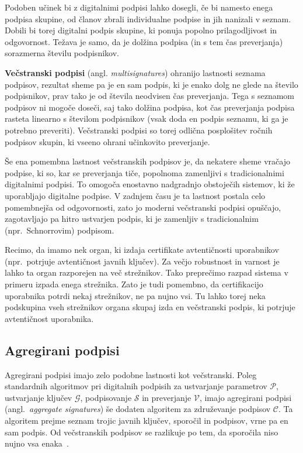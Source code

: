 Podoben učinek bi z digitalnimi podpisi lahko dosegli, če bi namesto enega podpisa skupine, od članov 
zbrali individualne podpise in jih nanizali v seznam. Dobili bi torej digitalni podpis skupine, ki 
ponuja popolno prilagodljivost in odgovornost. Težava je samo, da je dolžina podpisa (in s tem čas 
preverjanja) sorazmerna številu podpisnikov.

\textbf{Večstranski podpisi} (angl. \textit{multisignatures})
ohranijo lastnosti seznama podpisov, rezultat sheme pa je en sam podpis, ki je enako dolg ne glede 
na število podpisnikov, prav tako je od števila neodvisen čas preverjanja. Tega s seznamom podpisov 
ni mogoče doseči, saj tako dolžina podpisa, kot čas preverjanja podpisa rasteta linearno s številom 
podpisnikov (vsak doda en podpis seznamu, ki ga je potrebno preveriti). Večstranski podpisi so torej 
odlična posplošitev ročnih podpisov skupin, ki vseeno ohrani učinkovito preverjanje.

Še ena pomembna lastnost večstranskih podpisov je, da nekatere sheme vračajo podpise, ki so, kar se
preverjanja tiče, popolnoma zamenljivi s tradicionalnimi digitalnimi podpisi. To omogoča enostavno
nadgradnjo obstoječih sistemov, ki že uporabljajo digitalne podpise. V zadnjem času je ta lastnost
postala celo pomembnejša od odgovornosti, zato jo moderni večstranski podpisi opuščajo, zagotavljajo
pa hitro ustvarjen podpis, ki je zamenljiv s tradicionalnim (npr.\ Schnorrovim) podpisom.

\begin{primer}
    Recimo, da imamo nek organ, ki izdaja certifikate avtentičnosti uporabnikov (npr.\ potrjuje
    avtentičnost javnih ključev). Za večjo robustnost in varnost je lahko ta organ razporejen
    na več strežnikov. Tako preprečimo razpad sistema v primeru izpada enega strežnika. Zato je
    tudi pomembno, da certifikacijo uporabnika potrdi nekaj strežnikov, ne pa nujno vsi.
    Tu lahko torej neka podskupina vseh strežnikov organa skupaj izda en večstranski podpis, ki
    potrjuje avtentičnost uporabnika.
\end{primer}

\subsection{Agregirani podpisi}
Agregirani podpisi imajo zelo podobne lastnosti kot večstranski. Poleg standardnih algoritmov pri digitalnih
podpisih za ustvarjanje parametrov $\mathcal{P}$, ustvarjanje ključev $\mathcal{G}$, podpisovanje 
$\mathcal{S}$ in preverjanje $\mathcal{V}$, imajo agregirani podpisi (angl.\ \textit{aggregate signatures})
še dodaten algoritem za združevanje podpisov $\mathcal{C}$. Ta algoritem prejme seznam trojic javnih
ključev, sporočil in podpisov, vrne pa en sam podpis. Od večstranskih podpisov se razlikuje po tem,
da sporočila niso nujno vsa enaka~\cite{boneh2011aggregate}.

